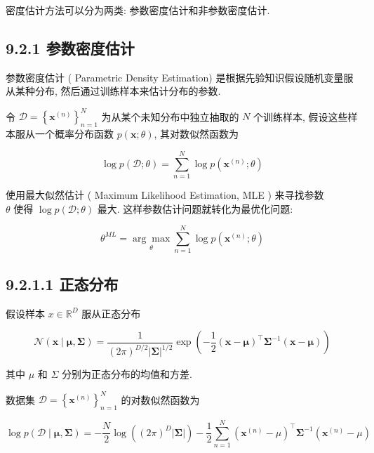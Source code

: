 \documentclass[10pt]{article}
\begin{document}
密度估计方法可以分为两类: 参数密度估计和非参数密度估计.

\subsection*{9.2.1 参数密度估计}
参数密度估计 ( Parametric Density Estimation) 是根据先验知识假设随机变量服从某种分布, 然后通过训练样本来估计分布的参数.

令 $\mathcal{D}=\left\{\boldsymbol{x}^{(n)}\right\}_{n=1}^{N}$ 为从某个未知分布中独立抽取的 $N$ 个训练样本, 假设这些样本服从一个概率分布函数 $p(\boldsymbol{x} ; \theta)$, 其对数似然函数为


\begin{equation*}
\log p(\mathcal{D} ; \theta)=\sum_{n=1}^{N} \log p\left(\boldsymbol{x}^{(n)} ; \theta\right) \tag{9.27}
\end{equation*}


使用最大似然估计 ( Maximum Likelihood Estimation, MLE ) 来寻找参数\\
$\theta$ 使得 $\log p(\mathcal{D} ; \theta)$ 最大. 这样参数估计问题就转化为最优化问题:


\begin{equation*}
\theta^{M L}=\underset{\theta}{\arg \max } \sum_{n=1}^{N} \log p\left(\boldsymbol{x}^{(n)} ; \theta\right) \tag{9.28}
\end{equation*}


\subsection*{9.2.1.1 正态分布}
假设样本 $x \in \mathbb{R}^{D}$ 服从正态分布


\begin{equation*}
\mathcal{N}(\boldsymbol{x} \mid \boldsymbol{\mu}, \boldsymbol{\Sigma})=\frac{1}{(2 \pi)^{D / 2}|\boldsymbol{\Sigma}|^{1 / 2}} \exp \left(-\frac{1}{2}(\boldsymbol{x}-\boldsymbol{\mu})^{\top} \boldsymbol{\Sigma}^{-1}(\boldsymbol{x}-\boldsymbol{\mu})\right) \tag{9.29}
\end{equation*}


其中 $\mu$ 和 $\Sigma$ 分别为正态分布的均值和方差.

数据集 $\mathcal{D}=\left\{\boldsymbol{x}^{(n)}\right\}_{n=1}^{N}$ 的对数似然函数为


\begin{equation*}
\log p(\mathcal{D} \mid \boldsymbol{\mu}, \boldsymbol{\Sigma})=-\frac{N}{2} \log \left((2 \pi)^{D}|\boldsymbol{\Sigma}|\right)-\frac{1}{2} \sum_{n=1}^{N}\left(\boldsymbol{x}^{(n)}-\mu\right)^{\top} \boldsymbol{\Sigma}^{-1}\left(\boldsymbol{x}^{(n)}-\mu\right) \tag{9.30}
\end{equation*}
\end{document}
